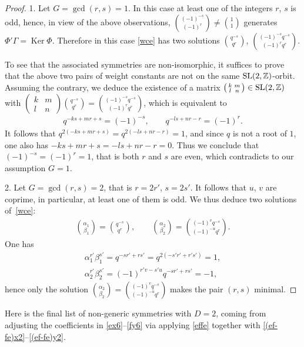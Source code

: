\documentclass[pdftex]{sigma}
\numberwithin{equation}{section}
\begin{document}
\begin{proof}
1. Let $G=\operatorname{gcd}(r,s)=1$. In this case at least one of the integers $r$, $s$ is odd, hence, in view of the above observations, $\binom{(-1)^{-s}}{(-1)^r}\ne\binom{1}{1}$ generates $\Phi'\Gamma=\operatorname{Ker}\Phi$. Therefore in this case \eqref{wce} has two solutions $\binom{q^{-s}}{q^r}$, $\binom{(-1)^{-s}q^{-s}}{(-1)^rq^r}$.

To see that the associated symmetries are non-isomorphic, it suffices to prove that the above two pairs of weight constants are not on the same ${\rm SL}(2,\mathbb{Z})$-orbit. Assuming the contrary, we deduce the existence of a matrix $\left(\begin{smallmatrix}k & m\\ l & n\end{smallmatrix}\right)\in {\rm SL}(2,\mathbb{Z})$ with $\left(\begin{smallmatrix}k & m\\ l & n\end{smallmatrix}\right)\binom{q^{-s}}{q^r}=\binom{(-1)^{-s}q^{-s}}{(-1)^rq^r}$, which is equivalent to
\begin{gather*}
q^{-ks+mr+s} =(-1)^{-s},\qquad q^{-ls+nr-r} =(-1)^r.
\end{gather*}
It follows that $q^{2(-ks+mr+s)}=q^{2(-ls+nr-r)}=1$, and since $q$ is not a root of $1$, one also has $-ks+mr+s=-ls+nr-r=0$. Thus we conclude that $(-1)^{-s}=(-1)^r=1$, that is both $r$ and $s$ are even, which contradicts to our assumption $G=1$.

2. Let $G=\operatorname{gcd}(r,s)=2$, that is $r=2r'$, $s=2s'$. It follows that $u$, $v$ are coprime, in particular, at least one of them is odd. We thus deduce two solutions of~\eqref{wce}:
\begin{gather*}
\binom{\alpha_1}{\beta_1}=\binom{q^{-s}}{q^r},\qquad \binom{\alpha_2}{\beta_2}=\binom{(-1)^vq^{-s}}{(-1)^{-u}q^r}.
\end{gather*}
One has
\begin{gather*}
\alpha_1^{r'}\beta_1^{s'} =q^{-sr'+rs'}=q^{2(-s'r'+r's')}=1, \\
\alpha_2^{r'}\beta_2^{s'} =(-1)^{r'v-s'u}q^{-sr'+rs'}=-1,
\end{gather*}
hence only the solution $\binom{\alpha_2}{\beta_2}=\binom{(-1)^vq^{-s}}{(-1)^{-u}q^r}$ makes the pair $(r,s)$ minimal.
\end{proof}

Here is the final list of non-generic symmetries with $D=2$, coming from adjusting the coefficients in \eqref{ex6}--\eqref{fy6} via applying \eqref{effe} together with \eqref{(ef-fe)x2}--\eqref{(ef-fe)y2}.
\end{document}

